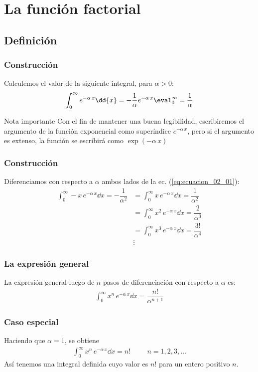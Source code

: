 \section{La función factorial}
\subsection{Definición}
\begin{frame}
\frametitle{Construcción}
Calculemos el valor de la siguiente integral, para $\alpha > 0$:
\begin{align}
\int_{0}^{\infty} e^{-\alpha \, x} \dd{x} = - \dfrac{1}{\alpha} e^{-\alpha \, x}\eval_{0}^{\infty} = \dfrac{1}{\alpha}
\label{eq:ecuacion_02_01}
\end{align}
\pause
\fontsize{12}{12}\selectfont
\begin{block}{Nota importante}
Con el fin de mantener una buena legibilidad, escribiremos el argumento de la función exponencial como superíndice $e^{-\alpha \, x}$, pero si el argumento es extenso, la función se escribirá como $\exp(-\alpha \, x)$
\end{block}
\end{frame}
\begin{frame}
\frametitle{Construcción}
Diferenciamos con respecto a $\alpha$ ambos lados de la ec. (\ref{eq:ecuacion_02_01}):
\begin{align*}
\int_{0}^{\infty} - x \, e^{-\alpha \, x} \dd{x} = - \dfrac{1}{\alpha^{2}} &= \int_{0}^{\infty} x \, e^{-\alpha \, x} \dd{x} = \dfrac{1}{\alpha^{2}} \\[0.5em]
&= \int_{0}^{\infty} x^{2} \, e^{-\alpha \, x} \dd{x} = \dfrac{2}{\alpha^{3}} \\[0.5em]
&= \int_{0}^{\infty} x^{3} \, e^{-\alpha \, x} \dd{x} = \dfrac{3!}{\alpha^{4}} \\
& \vdots
\end{align*}
\end{frame}
\begin{frame}
\frametitle{La expresión general}
La expresión general luego de $n$ pasos de diferenciación con respecto a $\alpha$ es:
\begin{align}
\int_{0}^{\infty} x^{n} \, e^{-\alpha \, x} \dd{x} = \dfrac{n!}{\alpha^{n+1}}
\label{eq:ecuacion_02_02}
\end{align}
\end{frame}
\begin{frame}
\frametitle{Caso especial}
Haciendo que $\alpha = 1$, se obtiene
\begin{align}
\int_{0}^{\infty} x^{n} \, e^{-\alpha \, x} \dd{x} = n! \hspace{1cm} n = 1, 2, 3, \ldots
\label{eq:ecuacion_02_03}
\end{align}
\pause
Así tenemos una integral definida cuyo valor es $n!$ para un entero positivo $n$.
\end{frame}
